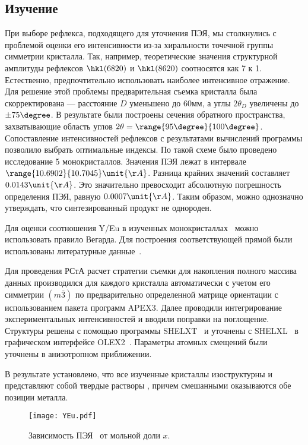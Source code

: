 \subsection{Изучение \YEu}
При выборе рефлекса, подходящего для уточнения ПЭЯ, мы столкнулись с проблемой оценки его интенсивности из-за хиральности точечной группы симметрии кристалла.
Так, например, теоретические значения структурной амплитуды рефлексов $\hkl(6 8 20)$ и $\hkl(8 6 20)$ соотносятся как 7 к 1.
Естественно, предпочтительно использовать наиболее интенсивное отражение.
Для решение этой проблемы предварительная съемка кристалла была скорректирована --- расстояние $D$ уменьшено до $60\unit{мм}$, а углы $2\theta_D$ увеличены до $\pm 75\degree$.
В результате были построены сечения обратного пространства, захватывающие область углов $2\theta = \range{95\degree}{100\degree}$.
Сопоставление интенсивностей рефлексов с результатами вычислений программы позволило выбрать оптимальные индексы.
По такой схеме было проведено исследование 5 монокристаллов.
Значения ПЭЯ лежат в интервале $\range{10.6902}{10.7045}\unit{\AA}$.
Разница крайних значений составляет $0.0143\unit{\AA}$.
Это значительно превосходит абсолютную погрешность определения ПЭЯ, равную $0.0007\unit{\AA}$.
Таким образом, можно однозначно утверждать, что синтезированный продукт не однороден.

Для оценки соотношения Y/Eu в изученных монокристаллах \YEu~можно использовать правило Вегарда.
Для построения соответствующей прямой были использованы литературные данные~\cite{Swanson:1954,Morris:1984}.

Для проведения РСтА расчет стратегии съемки для накопления полного массива данных производился для каждого кристалла автоматически с учетом его симметрии $(m\overline{3})$ по предварительно определенной матрице ориентации с использованием пакета программ APEX3.
Далее проводили интегрирование экспериментальных интенсивностей и вводили поправки на поглощение.
Структуры решены с помощью программы SHELXT~\cite{Sheldrick:2015:shelxt} и уточнены с SHELXL~\cite{Sheldrick:2015:shelxl} в графическом интерфейсе OLEX2~\cite{Dolomanov:2009}.
Параметры атомных смещений были уточнены в анизотропном приближении.

В результате установлено, что все изученные кристаллы изоструктурны и представляют собой твердые растворы \YEu, причем смешанными оказываются обе позиции металла.
\begin{figure}[ht!]
    \centering
    \texttt{[image: YEu.pdf]}
    \caption{Зависимость ПЭЯ \YEu~от мольной доли $x$.}
    \label{fig:YEu}
\end{figure}

